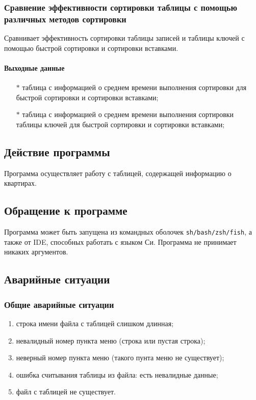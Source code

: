 \documentclass[a4paper,12pt]{extarticle}
\begin{document}
\subsubsection{Сравнение эффективности сортировки таблицы с помощью различных методов сортировки}
Сравнивает эффективность сортировки таблицы записей и таблицы ключей с помощью быстрой сортировки и сортировки вставками.

\paragraph{Выходные данные}
\begin{itemize}
    \item[$*$] таблица с информацией о среднем времени выполнения сортировки для быстрой сортировки и сортировки вставками;
    \item[$*$] таблица с информацией о среднем времени выполнения сортировки таблицы ключей для быстрой сортировки и сортировки вставками;
\end{itemize}

\subsection{Действие программы}
Программа осуществляет работу с таблицей, содержащей информацию о квартирах.

\subsection{Обращение к программе}
Программа может быть запущена из командных оболочек \texttt{sh/bash/zsh/fish}, а также от IDE, способных работать с языком Си. Программа не принимает никаких аргументов.

\subsection{Аварийные ситуации}
\subsubsection{Общие аварийные ситуации}
\begin{enumerate}
    \item строка имени файла с таблицей слишком длинная;
    \item невалидный номер пункта меню (строка или пустая строка);
    \item неверный номер пункта меню (такого пунта меню не существует);
    \item ошибка считывания таблицы из файла: есть невалидные данные;
    \item файл с таблицей не существует.
\end{enumerate}
\end{document}

